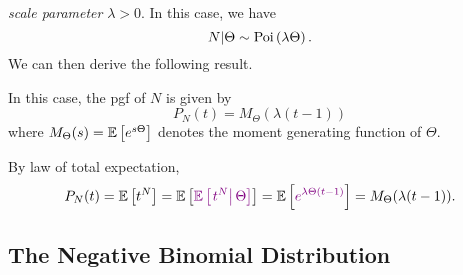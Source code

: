 \begin{enumerate}
\emph{scale parameter} \(\lambda>0\). In this case, we have
\[
N|\Theta\sim\operatorname{Poi}\left(\lambda\Theta\right).
\]
We can then derive the following result.
\begin{proposition}
\label{prp:mixed-pois-scale-pgf}
In this case, the pgf of \(N\) is given by
\[
P_N(t)=M_{\Theta}(\lambda(t-1))
\]
where \(M_{\Theta}(s)=\mathbb{E}\left[e^{s\Theta}\right]\) denotes the moment generating function of \(\Theta\).
\end{proposition}
\begin{pf}
By law of total expectation,
\[
P_N(t)=\mathbb{E}\left[t^{N}\right]=\mathbb{E}\left[{\color{violet}\mathbb{E}\left[\left. t^{N}\right|\Theta\right]}\right]
=\mathbb{E}\left[{\color{violet}e^{\lambda\Theta(t-1)}}\right]
=M_{\Theta}(\lambda(t-1)).
\]
\end{pf}
\end{enumerate}
\subsection{The Negative Binomial Distribution}
